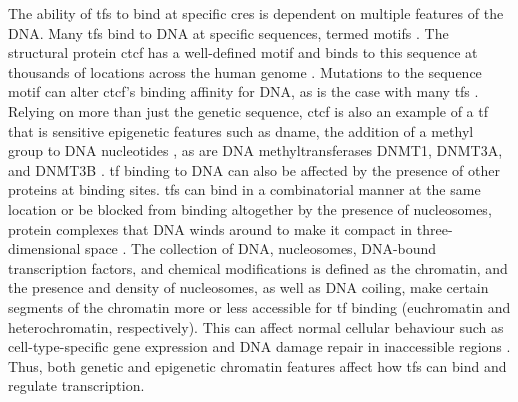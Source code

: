 The ability of \glspl{tf} to bind at specific \glspl{cre} is dependent on multiple features of the DNA.
Many \glspl{tf} bind to DNA at specific sequences, termed motifs \cite{farnhamInsightsGenomicProfiling2009,spitzTranscriptionFactorsEnhancer2012}.
The structural protein \gls{ctcf} has a well-defined motif and binds to this sequence at thousands of locations across the human genome \cite{kimAnalysisVertebrateInsulator2007,dixonTopologicalDomainsMammalian2012}.
Mutations to the sequence motif can alter \gls{ctcf}'s binding affinity for DNA, as is the case with many \glspl{tf} \cite{kasowskiVariationTranscriptionFactor2010,mauranoWidespreadSitedependentBuffering2012,mauranoLargescaleIdentificationSequence2015}.
Relying on more than just the genetic sequence, \Gls{ctcf} is also an example of a \gls{tf} that is sensitive epigenetic features such as \gls{dname}, the addition of a methyl group to DNA nucleotides \cite{mauranoRoleDNAMethylation2015,wangWidespreadPlasticityCTCF2012,wiehleDNAMethylationEmbryonic2019,xuNascentDNAMethylome2018,vinerModelingMethylsensitiveTranscription2016}, as are DNA methyltransferases DNMT1, DNMT3A, and DNMT3B \cite{gollEukaryoticCytosineMethyltransferases2005,listerHumanDNAMethylomes2009}.
\Gls{tf} binding to DNA can also be affected by the presence of other proteins at binding sites.
\Glspl{tf} can bind in a combinatorial manner at the same location \cite{farnhamInsightsGenomicProfiling2009,ongEnhancerFunctionNew2011,spitzTranscriptionFactorsEnhancer2012} or be blocked from binding altogether by the presence of nucleosomes, protein complexes that DNA winds around to make it compact in three-dimensional space \cite{henikoffNucleosomeDestabilizationEpigenetic2008,jiangNucleosomePositioningGene2009}.
The collection of DNA, nucleosomes, DNA-bound transcription factors, and chemical modifications is defined as the chromatin, and the presence and density of nucleosomes, as well as DNA coiling, make certain segments of the chromatin more or less accessible for \gls{tf} binding (euchromatin and heterochromatin, respectively).
This can affect normal cellular behaviour such as cell-type-specific gene expression \cite{vierstraGlobalReferenceMapping2020,cusanovichSingleCellAtlasVivo2018} and DNA damage repair in inaccessible regions \cite{polakCelloforiginChromatinOrganization2015}.
Thus, both genetic and epigenetic chromatin features affect how \glspl{tf} can bind and regulate transcription.

